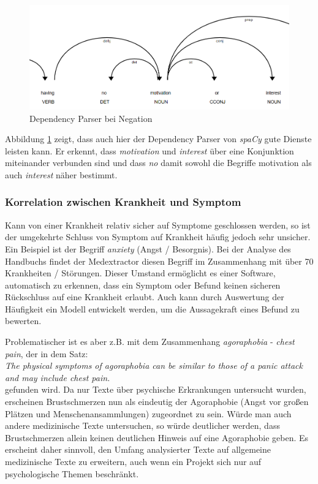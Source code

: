 \begin{figure}[h]
    \centering
    \includegraphics[width=\textwidth]{pictures/Dep_Parser_Negation.png}
    \caption{Dependency Parser bei Negation}
    \label{fig:negation}
\end{figure}

Abbildung \ref{fig:negation} zeigt, dass auch hier der Dependency Parser von \emph{spaCy} gute Dienste leisten kann. Er erkennt, dass \emph{motivation} und \emph{interest} über eine Konjunktion miteinander verbunden sind und dass \emph{no} damit sowohl die Begriffe {motivation} als auch \emph{interest} näher bestimmt.

\subsubsection{Korrelation zwischen Krankheit und Symptom}
\label{subsec: stigmatisierung} 

Kann von einer Krankheit relativ sicher auf Symptome geschlossen werden, so ist der umgekehrte Schluss von Symptom auf Krankheit häufig jedoch sehr unsicher. Ein Beispiel ist der Begriff \emph{anxiety} (Angst / Besorgnis). Bei der Analyse des Handbuchs findet der Medextractor diesen Begriff im Zusammenhang mit über 70 Krankheiten / Störungen. Dieser Umstand ermöglicht es einer Software, automatisch zu erkennen, dass ein Symptom oder Befund keinen sicheren Rückschluss auf eine Krankheit erlaubt. Auch kann durch Auswertung der Häufigkeit ein Modell entwickelt werden, um die Aussagekraft eines Befund zu bewerten.

Problematischer ist es aber z.B. mit dem Zusammenhang \emph{agoraphobia} - \emph{chest pain}, der in dem Satz:\\

\emph{\glqq The physical symptoms of agoraphobia can be similar to those of a panic attack and may include chest pain.\grqq}\\

gefunden wird. Da nur Texte über psychische Erkrankungen untersucht wurden, erscheinen Brustschmerzen nun als eindeutig der Agoraphobie (Angst vor großen Plätzen und Menschenansammlungen) zugeordnet zu sein. Würde man auch andere medizinische Texte untersuchen, so würde deutlicher werden, dass Brustschmerzen allein keinen deutlichen Hinweis auf eine Agoraphobie geben. Es erscheint daher sinnvoll, den Umfang analysierter Texte auf allgemeine medizinische Texte zu erweitern, auch wenn ein Projekt sich nur auf psychologische Themen beschränkt.

